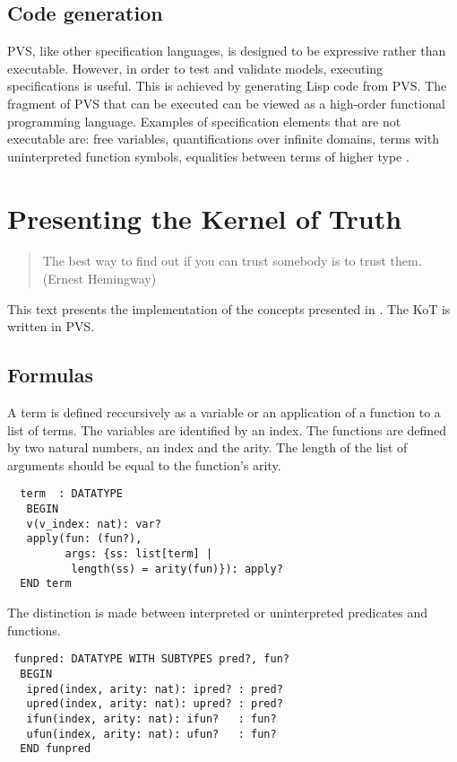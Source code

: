 \documentclass[a4paper,12pt]{article}
\begin{document}
\subsection{Code generation}
PVS, like other specification languages, is designed to be expressive rather than executable. However, in order to test and
validate models, executing specifications is useful. This is achieved by generating Lisp code from PVS. The fragment of PVS
that can be executed can be viewed as a high-order functional programming language. Examples of specification elements that 
are not executable are: free variables, quantifications over infinite domains, terms with uninterpreted function symbols, 
equalities between terms of higher type \cite{eexec}.

\section{Presenting the Kernel of Truth}

\begin{quotation}
 The best way to find out if you can trust somebody is to trust them. (Ernest Hemingway)
\end{quotation}

This text presents the implementation of the concepts presented in \cite{rewip}.
The KoT is written in PVS.

\subsection{Formulas}

A term is defined reccursively as a variable or an application of a function to a list of terms. The 
variables are identified by an index. The functions are defined by two natural numbers, an index and the 
arity. The length of the list of arguments should be equal to the function's arity.

\begin{verbatim}
  term  : DATATYPE 
   BEGIN
   v(v_index: nat): var?
   apply(fun: (fun?),
         args: {ss: list[term] | 
		  length(ss) = arity(fun)}): apply?
  END term
\end{verbatim} 
The distinction is made between interpreted or uninterpreted predicates and functions.
\begin{verbatim}
 funpred: DATATYPE WITH SUBTYPES pred?, fun?
  BEGIN
   ipred(index, arity: nat): ipred? : pred?
   upred(index, arity: nat): upred? : pred?
   ifun(index, arity: nat): ifun?   : fun?
   ufun(index, arity: nat): ufun?   : fun?
  END funpred
\end{verbatim}
\end{document}
